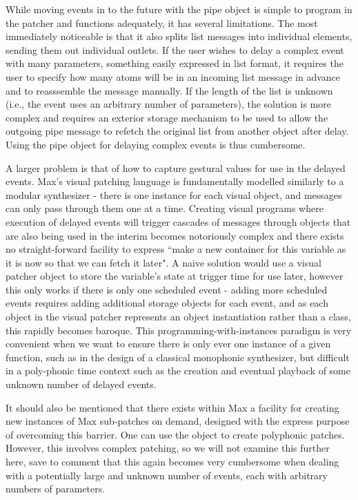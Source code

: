\documentclass[acmsmall]{acmart}
\begin{document}
While moving events in to the future with the pipe object is simple to program 
in the patcher and functions adequately, 
it has several limitations. The most immediately noticeable is that it also splits 
list messages into individual elements, sending them out individual outlets. 
If the user wishes to delay a complex event with many parameters, something easily 
expressed in list format, it requires the user to specify how many atoms will 
be in an incoming list message in advance and to reasssemble the message manually.
If the length of the list is unknown (i.e., the event uses an arbitrary number
of parameters), the solution is more complex and requires 
an exterior storage mechanism to be used to allow the outgoing 
pipe message to refetch the original list from another object after delay. Using
the pipe object for delaying complex events is thus cumbersome. 

A larger problem is that of how to capture gestural values for use in the delayed
events. Max's visual patching language is fundamentally modelled similarly to a modular
synthesizer - there is one instance for each visual object, and messages can only
pass through them one at a time. Creating visual programs where execution of 
delayed events will trigger cascades of messages through objects that are also 
being used in the interim becomes notoriously complex and there exists no straight-forward
facility to express ``make a new container for this variable as it is now so that
we can fetch it later". A naive solution would use a visual patcher object to store 
the variable's state at trigger time for use later, however this only works
if there is only one scheduled event - adding more scheduled events requires adding
additional storage objects for each event, and as each object in the visual patcher
represents an object instantiation rather than a class, this rapidly becomes
baroque. This programming-with-instances paradigm
is very convenient when we want to ensure there is only ever one instance of a given function, such
as in the design of a classical monophonic synthesizer, but difficult in a poly-phonic time context
such as the creation and eventual playback of some unknown number of delayed events.


It should also be mentioned that there exists within Max a facility for creating
new instances of Max sub-patches on demand, designed with the express purpose of
overcoming this barrier. One can use the  object to create polyphonic
patches. However, this involves complex patching, so we will not examine this further here,
save to comment that this again becomes very cumbersome when dealing
with a potentially large and unknown number of events, each with arbitrary numbers
of parameters.
\end{document}
